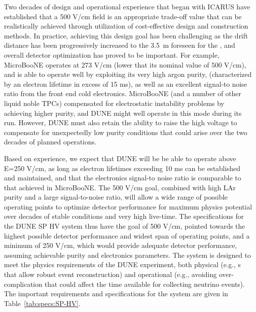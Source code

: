 Two decades of design and operational experience that began with ICARUS have established that a 500 V/cm field is an appropriate trade-off value that can be realistically achieved through utilization of cost-effective design and construction methods. In practice, achieving this design goal has been challenging as the drift distance has been progressively increased to the 
\SI{3.5}{m} foreseen for the , and overall detector optimization has proved to be important. For example, MicroBooNE operates  at 273 V/cm (lower that its nominal value of 500 V/cm), and is able to operate well by exploiting its very high argon purity, (characterized by an electron lifetime in excess of 15 ms), as well as an excellent signal-to noise ratio from the front end cold electronics.  %
MicroBooNE (and a number of other liquid noble TPCs) compensated for electrostatic instability problems by achieving higher purity, and DUNE might well operate in this mode during its run.  However, DUNE must also retain the ability to raise the high voltage to compensate for unexpectedly low purity conditions that could arise over the two decades of planned operations.

Based on experience, we expect that DUNE will be be able to operate  above E=250 V/cm, 
as long as electron lifetimes exceeding 10 ms can be established and maintained, %
and that the electronics signal-to noise ratio is comparable to that achieved in MicroBooNE. 
The 500 V/cm \efield goal, combined with high LAr purity and a large signal-to-noise ratio, will allow  a wide range of possible operating points to optimize detector performance for maximum physics potential over decades of stable conditions and very high live-time. 
The specifications for the DUNE SP HV system thus have the goal of 500 V/cm, pointed  towards the highest possible detector performance and widest span of operating points, and a minimum of 250 V/cm, which would provide adequate detector performance, assuming achievable purity and electronics parameters.
The  system is designed to meet the physics requirements of the DUNE experiment,  both physical  (e.g., \efield{}s that allow robust event reconstruction) and operational (e.g., avoiding over-complication that could affect %
the time available for collecting neutrino events). %
The important requirements and specifications for the  system are given in Table~\ref{tab:specs:SP-HV}.  

